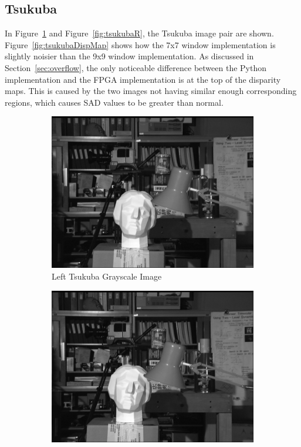 \subsection{Tsukuba}
\label{sec:tsukuba}

In Figure~\ref{fig:tsukubaL} and Figure~\ref{fig:tsukubaR}, the Tsukuba image pair are shown. Figure~\ref{fig:tsukubaDispMap} shows how the 7x7 window implementation is slightly noisier than the 9x9 window implementation. As discussed in Section~\ref{sec:overflow}, the only noticeable difference between the Python implementation and the FPGA implementation is at the top of the disparity maps. This is caused by the two images not having similar enough corresponding regions, which causes SAD values to be greater than normal.

\begin{figure}
\begin{center}
	\begin{subfigure}{0.45\textwidth}
		\includegraphics[width=\textwidth]{figures/tsukubaL.jpg}
		\caption{Left Tsukuba Grayscale Image}
		\label{fig:tsukubaL}
	\end{subfigure}
	\begin{subfigure}{0.45\textwidth}
		\includegraphics[width=\textwidth]{figures/tsukubaR.jpg}

\end{subfigure}
\end{center}
\end{figure}
